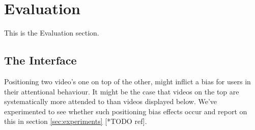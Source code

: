 \chapter{Evaluation}
\label{ch:evaluation}

This is the Evaluation section.


\section{The Interface}
Positioning two video's one on top of the other, might inflict a bias for users in their attentional behaviour. It might be the case that videos on the top are systematically more attended to than videos displayed below. We've experimented to see whether such positioning bias effects occur and report on this in section \ref{sec:experiments} [*TODO ref].
